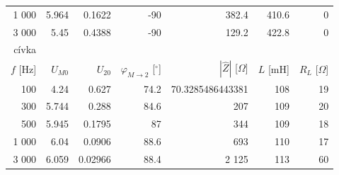 \documentclass[czech,11pt,a4paper]{article}
\begin{document}
\begin{center}
{\begin{tabular}{rrrrrrr}
				1 000        & 5.964                          & 0.1622   & -90                                  & 382.4                         & 410.6      & 0                \\
				3 000        & 5.45                           & 0.4388   & -90                                  & 129.2                         & 422.8      & 0                \\ \hline
				cívka       &                                &          &                                      &                               &          &                  \\
				$f$ [Hz]    & $U_{M0}$                       & $U_{20}$ & $\varphi_{M\rightarrow2}$ [$^\circ$] & $|\hat{Z}|$ [$\Omega$]        & $L$ [mH] & $R_L$ [$\Omega$] \\
				100         & 4.24                           & 0.627    & 74.2                                 & 70.3285486443381              & 108      & 19               \\
				300         & 5.744                          & 0.288    & 84.6                                 & 207                           & 109      & 20               \\
				500         & 5.945                          & 0.1795   & 87                                   & 344                           & 109      & 18               \\
				1 000       & 6.04                           & 0.0906   & 88.6                                 & 693                           & 110      & 17               \\
				3 000       & 6.059                          & 0.02966  & 88.4                                 & 2 125                         & 113      & 60              
			\end{tabular}}
		\end{center}
\end{document}
